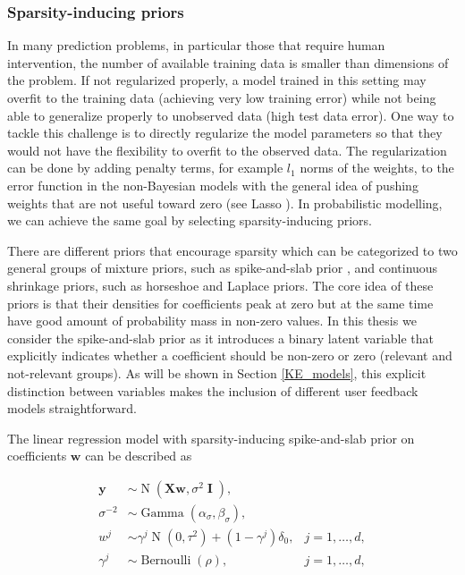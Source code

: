 \documentclass[dissertation,math,vertlayout,pdfa,colorlinks]{aaltoseries}
\newcommand{\bw}{\bm{w}}
\newcommand{\bX}{\bm{X}}
\newcommand{\by}{\bm{y}}
\DeclareMathOperator{\eye}{\textbf{I}}
\DeclareMathOperator{\bernoullipdf}{Bernoulli}
\DeclareMathOperator{\normalpdf}{N}
\DeclareMathOperator{\gammapdf}{Gamma}
\begin{document}
\subsubsection{Sparsity-inducing priors}

In many prediction problems, in particular those that require human intervention, the number of available training data is smaller than dimensions of the problem. If not regularized properly, a model trained in this setting may overfit to the training data (achieving very low training error) while not being able to generalize properly to unobserved data (high test data error). One way to tackle this challenge is to directly regularize the model parameters so that they would not have the flexibility to overfit to the observed data. The regularization can be done by adding penalty terms, for example $l_1$ norms of the weights, to the error function in the non-Bayesian models with the general idea of pushing weights that are not useful toward zero (see Lasso \cite{lasso2011}). In probabilistic modelling, we can achieve the same goal by selecting sparsity-inducing priors. 

There are different priors that encourage sparsity which can be categorized to two general groups of mixture priors, such as spike-and-slab prior \cite{spike_slab1993}, and continuous shrinkage priors, such as horseshoe \cite{horseshoe_2017} and Laplace \cite{seeger2008bayesian} priors. The core idea of these priors is that their densities for coefficients peak at zero but at the same time have good amount of probability mass in non-zero values. In this thesis we consider the spike-and-slab prior as it introduces a binary latent variable that explicitly indicates whether a coefficient should be non-zero or zero (relevant and not-relevant groups). As will be shown in Section \ref{KE_models}, this explicit distinction between variables makes the inclusion of different user feedback models straightforward.%

The linear regression model with sparsity-inducing spike-and-slab prior on coefficients $\bw$ can be described as

\begin{align}\label{Eq:ss_Bayesian_regression}
\by &\sim \normalpdf(\bX\bw,\sigma^2 \eye), \\
\sigma^{-2} &\sim \gammapdf(\alpha_{\sigma}, \beta_{\sigma}), \nonumber \\
w^j &\sim \gamma^j \normalpdf(0, \tau^2) + (1 - \gamma^j) \delta_0,  & j=1,\ldots,d, \nonumber\\
\gamma^j &\sim \bernoullipdf(\rho), & j=1,\ldots,d, \nonumber
\end{align}
\end{document}
